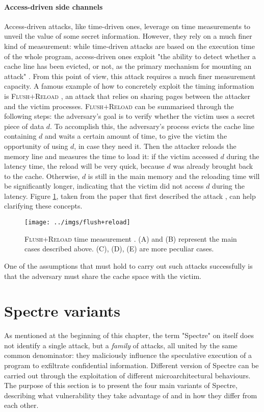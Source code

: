 \documentclass[12pt,a4paper]{book}
\theoremstyle{definition}
\begin{document}
	\paragraph{Access-driven side channels} 
	Access-driven attacks, like time-driven ones, leverage on time measurements to unveil the value of some secret information. However, they rely on a much finer kind of measurement: while time-driven attacks are based on the execution time of the whole program, access-driven ones exploit "the ability to
	detect whether a cache line has been evicted, or not, as the primary
	mechanism for mounting an attack" \cite{Neve2007}. From this point of view, this attack requires a much finer measurement capacity. A famous example of how to concretely exploit the timing information is \textsc{Flush$+$Reload} \cite{Yarom2014}, an attack that relies on sharing pages between the attacker and the victim processes. \textsc{Flush$+$Reload} can be summarised through the following steps: the adversary's goal is to verify whether the victim uses a secret piece of data $d$. To accomplish this, the adversary's process evicts the cache line containing $d$ and waits a certain amount of time, to give the victim the opportunity of using $d$, in case they need it. Then the attacker reloads the memory line and measures the time to load it: if the victim accessed $d$ during the latency time, the reload will be very quick, because $d$ was already brought back to the cache. Otherwise, $d$ is still in the main memory and the reloading time will be significantly longer, indicating that the victim did not access $d$ during the latency. Figure \ref{fig:flush-reload}, taken from the paper that first described the attack \cite{Yarom2014}, can help clarifying these concepts.
	\begin{figure}[h!]
		\centering
		\texttt{[image: ../imgs/flush+reload]}
		\captionsetup{width=.8\linewidth}
		\caption{\textsc{Flush+Reload} time measurement \cite{Yarom2014}. (A) and (B) represent the main cases described above. (C), (D), (E) are more peculiar cases.}
		\label{fig:flush-reload}
	\end{figure}
	One of the assumptions that must hold to carry out such attacks successfully is that the adversary must share the cache space with the victim.
	
	\section{Spectre variants}\label{sec:spectre-var}
	As mentioned at the beginning of this chapter, the term "Spectre" on itself does not identify a single attack, but a \textit{family} of attacks, all united by the same common denominator: they maliciously influence the speculative execution of a program to exfiltrate confidential information. Different version of Spectre can be carried out through the exploitation of different microarchitectural behaviours. The purpose of this section is to present the four main variants of Spectre, describing what vulnerability they take advantage of and in how they differ from each other.
\end{document}
